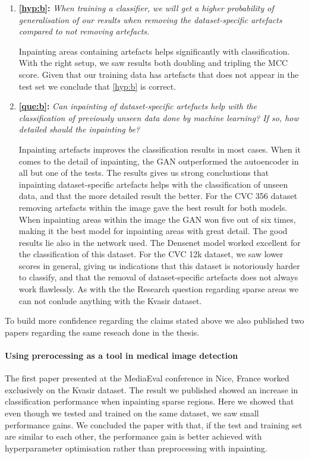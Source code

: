 \begin{enumerate}
\item \textbf{\ref{hyp:b}:} \textit{When training a classifier, we will get a higher probability of generalisation of our results when removing the dataset-specific artefacts compared to not removing artefacts.}
	
Inpainting areas containing artefacts helps significantly with classification. With the right setup, we saw results both doubling and tripling the MCC score. Given that our training data has artefacts that does not appear in the test set we conclude that \ref{hyp:b} is correct.


\item \textbf{\ref{que:b}:} \textit{ Can inpainting of dataset-specific artefacts help with the classification of previously unseen data done by machine learning? If so, how detailed should the inpainting be?}
	
    
Inpainting artefacts improves the classification results in most cases. When it comes to the detail of inpainting, the GAN outperformed the autoencoder in all but one of the tests. The results gives us strong conclustions that inpainting dataset-specific artefacts helps with the classification of unseen data, and that the more detailed result the better.
For the CVC 356 dataset removing artefacts within the image gave the best result for both models. When inpainting areas within the image the GAN won five out of six times, making it the best model for inpainting  areas with great detail. The good results lie also in the network used. The Densenet model worked excellent for the classification of this dataset.
For the CVC 12k dataset, we saw lower scores in general, giving us indications that this dataset is notoriously harder to classify, and that the removal of dataset-specific artefacts does not always work flawlessly. 
As with the the Research question regarding sparse areas we can not conlude anything with the Kvasir dataset.


\end{enumerate}



To build more confidence regarding the claims stated above we also published two papers regarding the same reseach done in the thesis.

\paragraph{Using prerocessing as a tool in medical image detection~\cite{Mathias2018MediaevalPaper}}
The first paper presented at the MediaEval conference in Nice, France worked exclusively on the Kvasir dataset. The result we published showed an increase in classification performance when inpainting sparse regions. 
Here we showed that even though we tested and trained on the same dataset, we saw small performance gains. We concluded the paper with that, if the test and training set are similar to each other, the performance gain is better achieved with hyperparameter optimisation rather than preprocessing with inpainting. 


